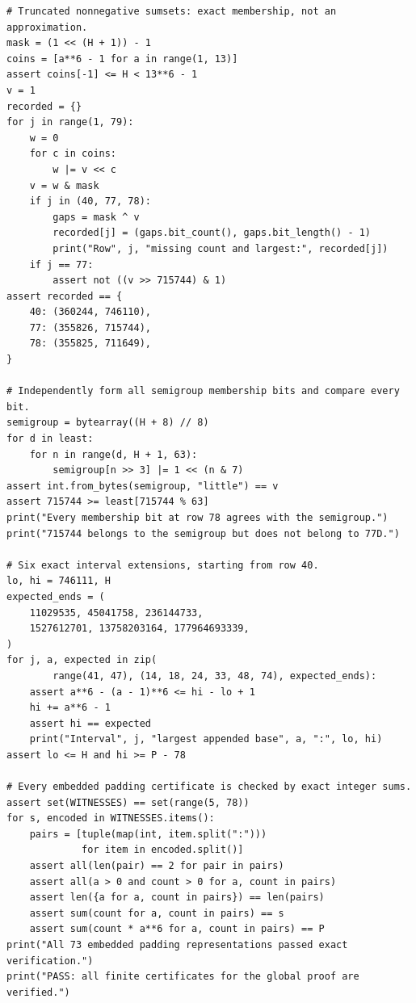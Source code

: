 \documentclass[11pt,a4paper]{article}
\numberwithin{equation}{section}
\theoremstyle{remark}
\begin{document}
\begin{Verbatim}[fontsize=\footnotesize,breaklines,breakanywhere]
# Truncated nonnegative sumsets: exact membership, not an approximation.
mask = (1 << (H + 1)) - 1
coins = [a**6 - 1 for a in range(1, 13)]
assert coins[-1] <= H < 13**6 - 1
v = 1
recorded = {}
for j in range(1, 79):
    w = 0
    for c in coins:
        w |= v << c
    v = w & mask
    if j in (40, 77, 78):
        gaps = mask ^ v
        recorded[j] = (gaps.bit_count(), gaps.bit_length() - 1)
        print("Row", j, "missing count and largest:", recorded[j])
    if j == 77:
        assert not ((v >> 715744) & 1)
assert recorded == {
    40: (360244, 746110),
    77: (355826, 715744),
    78: (355825, 711649),
}

# Independently form all semigroup membership bits and compare every bit.
semigroup = bytearray((H + 8) // 8)
for d in least:
    for n in range(d, H + 1, 63):
        semigroup[n >> 3] |= 1 << (n & 7)
assert int.from_bytes(semigroup, "little") == v
assert 715744 >= least[715744 % 63]
print("Every membership bit at row 78 agrees with the semigroup.")
print("715744 belongs to the semigroup but does not belong to 77D.")

# Six exact interval extensions, starting from row 40.
lo, hi = 746111, H
expected_ends = (
    11029535, 45041758, 236144733,
    1527612701, 13758203164, 177964693339,
)
for j, a, expected in zip(
        range(41, 47), (14, 18, 24, 33, 48, 74), expected_ends):
    assert a**6 - (a - 1)**6 <= hi - lo + 1
    hi += a**6 - 1
    assert hi == expected
    print("Interval", j, "largest appended base", a, ":", lo, hi)
assert lo <= H and hi >= P - 78

# Every embedded padding certificate is checked by exact integer sums.
assert set(WITNESSES) == set(range(5, 78))
for s, encoded in WITNESSES.items():
    pairs = [tuple(map(int, item.split(":")))
             for item in encoded.split()]
    assert all(len(pair) == 2 for pair in pairs)
    assert all(a > 0 and count > 0 for a, count in pairs)
    assert len({a for a, count in pairs}) == len(pairs)
    assert sum(count for a, count in pairs) == s
    assert sum(count * a**6 for a, count in pairs) == P
print("All 73 embedded padding representations passed exact verification.")
print("PASS: all finite certificates for the global proof are verified.")
\end{Verbatim}

\clearpage
\end{document}
